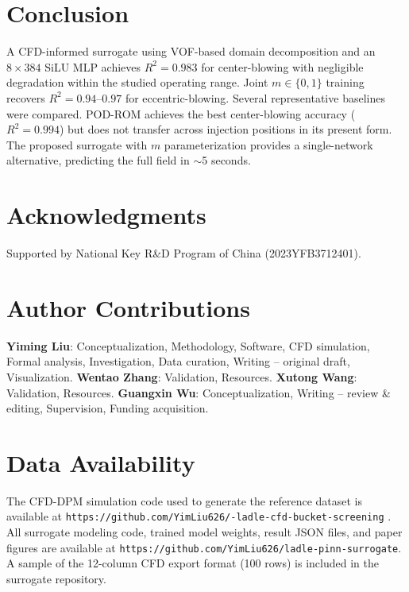 \documentclass[12pt,a4paper]{article}
\begin{document}
\FloatBarrier\section{Conclusion}
A CFD-informed surrogate using VOF-based domain decomposition and an $8\times384$ SiLU MLP achieves $R^{2}=0.983$ for center-blowing with negligible degradation within the studied operating range. Joint $m\in\{0,1\}$ training recovers $R^{2}=0.94$--$0.97$ for eccentric-blowing. Several representative baselines were compared. POD-ROM achieves the best center-blowing accuracy ($R^{2}=0.994$) but does not transfer across injection positions in its present form. The proposed surrogate with $m$ parameterization provides a single-network alternative, predicting the full field in $\sim$5 seconds.

\section*{Acknowledgments}
Supported by National Key R\&D Program of China (2023YFB3712401).

\section*{Author Contributions}
\textbf{Yiming Liu}: Conceptualization, Methodology, Software, CFD simulation, Formal analysis, Investigation, Data curation, Writing -- original draft, Visualization. \textbf{Wentao Zhang}: Validation, Resources. \textbf{Xutong Wang}: Validation, Resources. \textbf{Guangxin Wu}: Conceptualization, Writing -- review \& editing, Supervision, Funding acquisition.

\section*{Data Availability}
The CFD-DPM simulation code used to generate the reference dataset is available at \texttt{https://github.com/YimLiu626/-ladle-cfd-bucket-screening} \cite{liu2026cfd}. All surrogate modeling code, trained model weights, result JSON files, and paper figures are available at \texttt{https://github.com/YimLiu626/ladle-pinn-surrogate}. A sample of the 12-column CFD export format (100 rows) is included in the surrogate repository.
\end{document}
